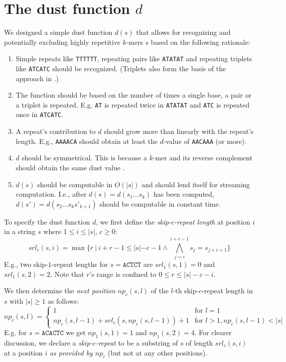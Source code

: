 \documentclass[pdflatex,sn-vancouver-num]{sn-jnl}
\begin{document}
    \section{The dust function $d$}\label{dustfunction}
We designed a simple dust function $d(s)$ that allows for recognizing and potentially excluding highly repetitive $k$-mers $s$ based on the following rationale:
\begin{enumerate}
	\item Simple repeats like \texttt{TTTTTT}, repeating pairs like \texttt{ATATAT} and repeating triplets like \texttt{ATCATC} should be recognized. (Triplets also form the basis of the approach in \cite{doi:10.1089/cmb.2006.13.1028}.)
	\item The function should be based on the number of times a single base, a pair or a triplet is repeated. E.g. \texttt{AT} is repeated twice in \texttt{ATATAT} and \texttt{ATC} is repeated once in \texttt{ATCATC}. 
	\item A repeat's contribution to $d$ should grow more than linearly with the repeat's length. E.g., \texttt{AAAACA} should obtain at least the $d$-value of \texttt{AACAAA} (or more). 
	\item $d$ should be symmetrical. This is because a $k$-mer and its reverse complement should obtain the same dust value \citep{doi:10.1089/cmb.2006.13.1028}.
	\item $d(s)$ should be computable in $O(|s|)$ and should lend itself for streaming computation. I.e., after $d(s) = d(s_1 \ldots s_k)$ has been computed, $d(s') = d(s_2 \ldots s_k s'_{k+1})$ should be computable in constant time.
\end{enumerate}

To specify the dust function $d$, we first define the \emph{skip-$c$-repeat length} at position $i$ in a string $s$ where  $1 \leq i \leq |s|$, $c \geq 0$:    
\[srl_c(s, i) = \max \{ r\ |\ i + r - 1 \leq |s| - c - 1 \wedge \bigwedge_{j = i}^{i + r - 1} s_j = s_{j + c + 1} \}\]
E.g., two skip-$1$-repeat lengths for $s = \texttt{ACTCT}$ are $srl_1(s, 1) = 0$ and $srl_1(s, 2) = 2$. Note that $r$'s range is confined to $0 \leq r \leq |s| - c - i$.

We then determine the \emph{next position} $np_c(s,l)$ of the $l$-th skip-$c$-repeat length in $s$ with $|s| \geq 1$ as follows: 
\[
    np_c(s, l) = \begin{cases}
        1 & \text{for } l = 1\\
        np_c(s, l - 1) + srl_c(s, np_c(s, l - 1)) + 1 & \text{for } l > 1, np_c(s, l - 1)  < |s|
        \end{cases}
  \]
E.g. for $s = \texttt{ACACTC}$ we get $np_1(s, 1) = 1$ and $np_1(s, 2) = 4$.
For clearer discussion, we declare a \emph{skip-$c$-repeat} to be a substring of $s$ of length $srl_c(s,i)$ at a position $i$ \emph{as provided by $np_c$} (but not at any other positions).
\end{document}
